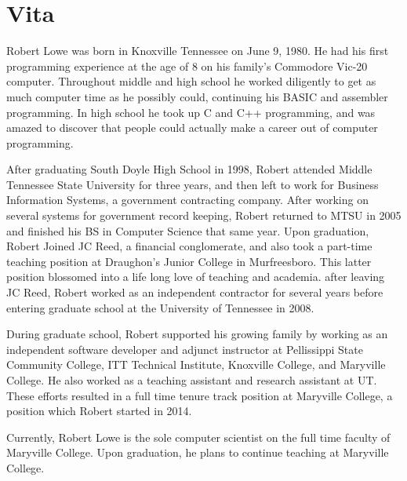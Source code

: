 \chapter*{Vita} \label{ch:vita}
Robert Lowe was born in Knoxville Tennessee on June 9, 1980.  He had
his first programming experience at the age of 8 on his family's
Commodore Vic-20 computer.  Throughout middle and high school he
worked diligently to get as much computer time as he possibly could,
continuing his BASIC and assembler programming.
In high school he took up C and C++ programming, and was amazed to
discover that people could actually make a career out of computer
programming.

After graduating South Doyle High School in 1998, Robert attended
Middle Tennessee State University for three years, and then left to
work for Business Information Systems, a government contracting
company.  After working on several systems for government record
keeping, Robert returned to MTSU in 2005 and finished his BS in
Computer Science that same year.  Upon graduation, Robert Joined JC
Reed, a financial conglomerate, and also took a part-time teaching
position at Draughon's Junior College in Murfreesboro.  This latter
position blossomed into a life long love of teaching and academia.
after leaving JC Reed, Robert worked as an independent contractor for
several years before entering graduate school at the University of
Tennessee in 2008.

During graduate school, Robert supported his growing family by working
as an independent software developer and adjunct instructor at
Pellissippi State Community College, ITT Technical Institute,
Knoxville College, and Maryville College.  He also worked as a
teaching assistant and research assistant at UT.  These efforts
resulted in a full time tenure track position at Maryville College, a
position which Robert started in 2014.

Currently, Robert Lowe is the sole computer scientist on the full time
faculty of Maryville College.  Upon graduation, he plans to continue
teaching at Maryville College.
